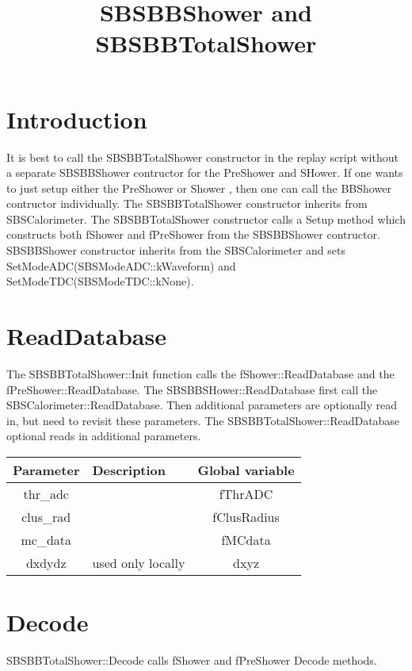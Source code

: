 \documentclass[11pt]{article}
\begin{document}
\title{SBSBBShower and SBSBBTotalShower}
\maketitle

\section{Introduction}
It is best to call the SBSBBTotalShower constructor in the replay script without a separate SBSBBShower contructor
for the PreShower and SHower. If one wants to
just setup either the PreShower or Shower , then one can call the BBShower contructor individually.
The SBSBBTotalShower constructor inherits from SBSCalorimeter. The  SBSBBTotalShower constructor
calls a Setup method which constructs both fShower and fPreShower from the SBSBBShower contructor.
SBSBBShower constructor inherits from the SBSCalorimeter and sets  SetModeADC(SBSModeADC::kWaveform) and
SetModeTDC(SBSModeTDC::kNone).



\section{ReadDatabase}
The SBSBBTotalShower::Init function calls the fShower::ReadDatabase and the fPreShower::ReadDatabase.
The SBSBBSHower::ReadDatabase first call the SBSCalorimeter::ReadDatabase. 
Then  additional parameters are optionally read in, but need to revisit these parameters.
The SBSBBTotalShower::ReadDatabase optional reads in additional parameters.
\begin{table}[h]
	\begin{center}
		\begin{tabularx}{\textwidth}{|c|X|c|}
			\hline 
			Parameter	& Description &  Global variable\\ 
			\hline
		thr\_adc	 &   & fThrADC \\
		\hline
		clus\_rad & & fClusRadius \\
		\hline
		mc\_data & & fMCdata \\
		\hline
		dxdydz & used only locally & dxyz \\
		\hline
\end{tabularx} 
\end{center}
\end{table}

\section{Decode}
SBSBBTotalShower::Decode calls fShower and fPreShower Decode methods.
\end{document}
